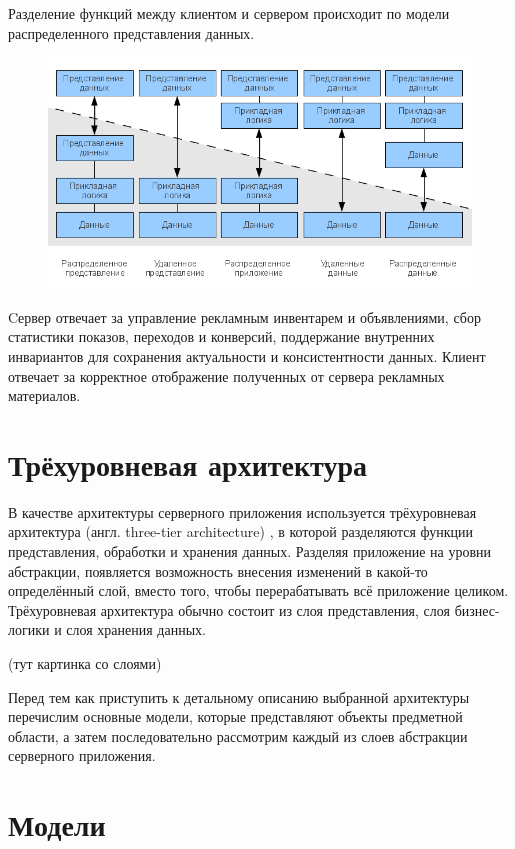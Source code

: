 \documentclass[times]{itmo-student-thesis}
\begin{document}
Разделение функций между клиентом и сервером происходит по модели распределенного представления данных.

\begin{figure}[h]
\includegraphics[width=\textwidth]{cs-models}
\centering
\end{figure}

Cервер отвечает за управление рекламным инвентарем и объявлениями, сбор статистики показов, переходов и конверсий, поддержание внутренних инвариантов для сохранения актуальности и консистентности данных. Клиент отвечает за корректное отображение полученных от сервера рекламных материалов.

\section{Трёхуровневая архитектура}

В качестве архитектуры серверного приложения используется трёхуровневая архитектура (англ. three-tier architecture) \cite{three-tier-architecture}, в которой разделяются функции представления, обработки и хранения данных. Разделяя приложение на уровни абстракции, появляется возможность внесения изменений в какой-то определённый слой, вместо того, чтобы перерабатывать всё приложение целиком. Трёхуровневая архитектура обычно состоит из слоя представления, слоя бизнес-логики и слоя хранения данных.

(тут картинка со слоями)

Перед тем как приступить к детальному описанию выбранной архитектуры перечислим основные модели, которые представляют объекты предметной области, а затем последовательно рассмотрим каждый из слоев абстракции серверного приложения. 

\section{Модели}\label{sec:models}
\end{document}
